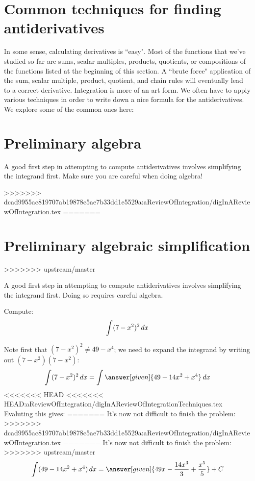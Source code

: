\documentclass[nooutcomes]{ximera}
\begin{document}



\section{Common techniques for finding antiderivatives}
In some sense, calculating derivatives is ``easy".  Most of the functions that we've studied so far are sums, scalar multiples, products, quotients, or compositions of the functions listed at the beginning of this section.  A ``brute force" application of the sum, scalar multiple, product, quotient, and chain rules will eventually lead to a correct derivative.  Integration is more of an art form.  We often have to apply various techniques in order to write down a nice formula for the antiderivatives. We explore some of the common ones here:

\section{Preliminary algebra}

A good first step in attempting to compute antiderivatives involves simplifying the integrand first.  Make sure you are careful when doing algebra!


>>>>>>> dcad9955ac819707ab19878c5ae7b33dd1e5529a:aReviewOfIntegration/digInAReviewOfIntegration.tex
=======
\section{Preliminary algebraic simplification}

>>>>>>> upstream/master

A good first step in attempting to compute antiderivatives involves simplifying the integrand first.  Doing so requires careful algebra.
\begin{example}
  Compute:
  \[
  \int (7-x^2)^2 \mathop{}\!d x
  \]
  \begin{explanation}
   Note first that $(7-x^2)^2 \neq 49-x^4$; we need to expand the integrand by writing out $(7-x^2)(7-x^2)$:
    \[
    \int (7-x^2)^2 \d x  = \int \answer[given]{49 - 14x^2 + x^4} \d x
    \]
<<<<<<< HEAD
<<<<<<< HEAD:aReviewOfIntegration/digInAReviewOfIntegrationTechniques.tex
Evaluting this gives:
=======
    It's now not difficult to finish the problem:
>>>>>>> dcad9955ac819707ab19878c5ae7b33dd1e5529a:aReviewOfIntegration/digInAReviewOfIntegration.tex
=======
    It's now not difficult to finish the problem:
>>>>>>> upstream/master
    \[
    \int (49 - 14x^2 + x^4) \d x = \answer[given]{49x - \frac{14 x^3}{3} + \frac{x^5}{5}} + C
    \]
  \end{explanation}
\end{example}
\end{document}
